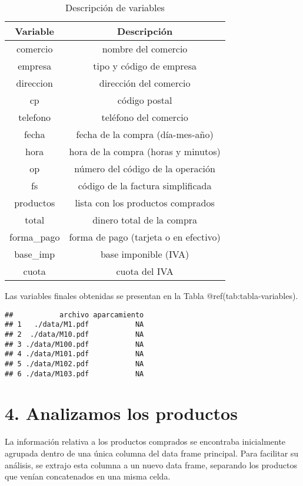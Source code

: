 \documentclass[,,,oneauthor,pdftex]{Definitions/mdpi}
\begin{document}
\begin{table}

\caption{\label{tab:tabla-variables}Descripción de variables}
\centering
\begin{tabular}[t]{cc}
\toprule
Variable & Descripción\\
\midrule
comercio & nombre del comercio\\
empresa & tipo y código de empresa\\
direccion & dirección del comercio\\
cp & código postal\\
telefono & teléfono del comercio\\
\addlinespace
fecha & fecha de la compra (día-mes-año)\\
hora & hora de la compra (horas y minutos)\\
op & número del código de la operación\\
fs & código de la factura simplificada\\
productos & lista con los productos comprados\\
\addlinespace
total & dinero total de la compra\\
forma\_pago & forma de pago (tarjeta o en efectivo)\\
base\_imp & base imponible (IVA)\\
cuota & cuota del IVA\\
\bottomrule
\end{tabular}
\end{table}

Las variables finales obtenidas se presentan en la Tabla
@ref(tab:tabla-variables).

\begin{verbatim}
##           archivo aparcamiento
## 1   ./data/M1.pdf           NA
## 2  ./data/M10.pdf           NA
## 3 ./data/M100.pdf           NA
## 4 ./data/M101.pdf           NA
## 5 ./data/M102.pdf           NA
## 6 ./data/M103.pdf           NA
\end{verbatim}

\hypertarget{analizamos-los-productos}{%
\section{4. Analizamos los productos}\label{analizamos-los-productos}}

La información relativa a los productos comprados se encontraba
inicialmente agrupada dentro de una única columna del data frame
principal. Para facilitar su análisis, se extrajo esta columna a un
nuevo data frame, separando los productos que venían concatenados en una
misma celda.
\end{document}
